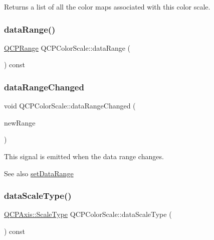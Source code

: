 Returns a list of all the color maps associated with this color scale. \mbox{\label{class_q_c_p_color_scale_a51f5756f99867bd91e570eddefeb1ef4}} 
\subsubsection{\texorpdfstring{dataRange()}{dataRange()}}
{\footnotesize\ttfamily \mbox{\hyperlink{class_q_c_p_range}{Q\+C\+P\+Range}} Q\+C\+P\+Color\+Scale\+::data\+Range (\begin{DoxyParamCaption}{ }\end{DoxyParamCaption}) const\hspace{0.3cm}{\ttfamily [inline]}}

\mbox{\label{class_q_c_p_color_scale_a685717490a6aa83c5e711a4f34e837f9}} 
\subsubsection{\texorpdfstring{dataRangeChanged}{dataRangeChanged}}
{\footnotesize\ttfamily void Q\+C\+P\+Color\+Scale\+::data\+Range\+Changed (\begin{DoxyParamCaption}\item[{const \mbox{\hyperlink{class_q_c_p_range}{Q\+C\+P\+Range}} \&}]{new\+Range }\end{DoxyParamCaption})\hspace{0.3cm}{\ttfamily [signal]}}

This signal is emitted when the data range changes.

\begin{DoxySeeAlso}{See also}
\mbox{\hyperlink{class_q_c_p_color_scale_abe88633003a26d1e756aa74984587fef}{set\+Data\+Range}} 
\end{DoxySeeAlso}
\mbox{\label{class_q_c_p_color_scale_ad864329d93cbd7396af1b2024db7fcfe}} 
\subsubsection{\texorpdfstring{dataScaleType()}{dataScaleType()}}
{\footnotesize\ttfamily \mbox{\hyperlink{class_q_c_p_axis_a36d8e8658dbaa179bf2aeb973db2d6f0}{Q\+C\+P\+Axis\+::\+Scale\+Type}} Q\+C\+P\+Color\+Scale\+::data\+Scale\+Type (\begin{DoxyParamCaption}{ }\end{DoxyParamCaption}) const\hspace{0.3cm}{\ttfamily [inline]}}

